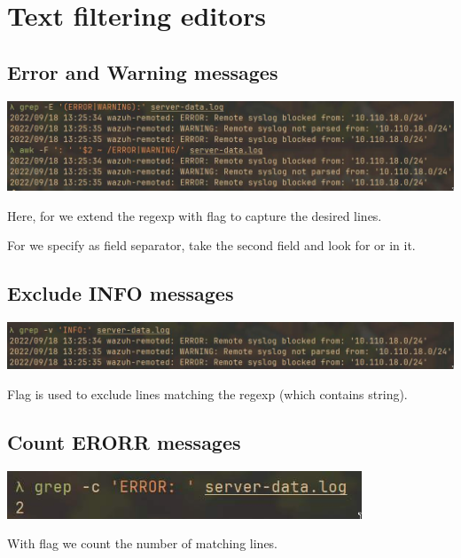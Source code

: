 \documentclass{article}
\begin{document}
\section{Text filtering editors}

\subsection{Error and Warning messages}
\noindent

\includegraphics[width=460pt]{3_2-1.jpg}
\newline

Here, for  we extend the regexp with  flag to capture the desired lines.

For  we specify  as field separator, take the second field and look for  or  in it.

\subsection{Exclude INFO messages}
\noindent

\includegraphics[width=460pt]{3_2-2.jpg}
\newline

Flag  is used to exclude lines matching the regexp (which contains  string).

\subsection{Count ERORR messages}
\noindent

\includegraphics[width=300pt]{3_2-3.jpg}
\newline

With flag  we count the number of matching lines.
\end{document}
